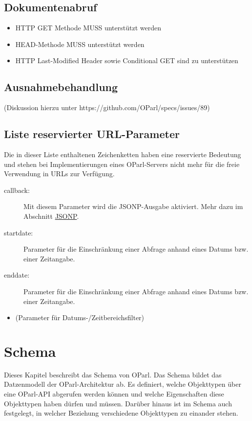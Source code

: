 \documentclass[,a4paper]{article}
\begin{document}
\subsection{Dokumentenabruf}

\begin{itemize}
\item
  HTTP GET Methode MUSS unterstützt werden
\item
  HEAD-Methode MUSS unterstützt werden
\item
  HTTP Last-Modified Header sowie Conditional GET sind zu unterstützen
\end{itemize}

\subsection{Ausnahmebehandlung}

(Diskussion hierzu unter https://github.com/OParl/specs/issues/89)

\subsection{Liste reservierter URL-Parameter}

Die in dieser Liste enthaltenen Zeichenketten haben eine reservierte
Bedeutung und stehen bei Implementierungen eines OParl-Servers nicht
mehr für die freie Verwendung in URLs zur Verfügung.

\begin{description}
\item[callback:]
Mit diesem Parameter wird die JSONP-Ausgabe aktiviert. Mehr dazu im
Abschnitt \hyperref[jsonp]{JSONP}.
\item[startdate:]
Parameter für die Einschränkung einer Abfrage anhand eines Datums bzw.
einer Zeitangabe.
\item[enddate:]
Parameter für die Einschränkung einer Abfrage anhand eines Datums bzw.
einer Zeitangabe.
\end{description}

\begin{itemize}
\item
  (Parameter für Datums-/Zeitbereichsfilter)
\end{itemize}

\section{Schema}

Dieses Kapitel beschreibt das Schema von OParl. Das Schema bildet das
Datzenmodell der OParl-Architektur ab. Es definiert, welche Objekttypen
über eine OParl-API abgerufen werden können und welche Eigenschaften
diese Objekttypen haben dürfen und müssen. Darüber hinaus ist im Schema
auch festgelegt, in welcher Beziehung verschiedene Objekttypen zu
einander stehen.
\end{document}
